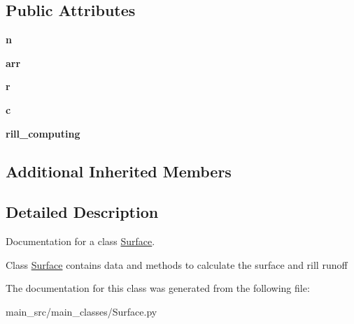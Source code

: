 \subsection*{Public Attributes}
\begin{DoxyCompactItemize}
\item 
\hypertarget{classmain__src_1_1main__classes_1_1Surface_1_1Surface_affe1eb422f70176b0402825e8baf11d4}{{\bfseries n}}\label{classmain__src_1_1main__classes_1_1Surface_1_1Surface_affe1eb422f70176b0402825e8baf11d4}

\item 
\hypertarget{classmain__src_1_1main__classes_1_1Surface_1_1Surface_ab672eba1391bdf0c79dbf2c6ee751b56}{{\bfseries arr}}\label{classmain__src_1_1main__classes_1_1Surface_1_1Surface_ab672eba1391bdf0c79dbf2c6ee751b56}

\item 
\hypertarget{classmain__src_1_1main__classes_1_1Surface_1_1Surface_a02a98426c0d4f7ff0fb32623250d7c84}{{\bfseries r}}\label{classmain__src_1_1main__classes_1_1Surface_1_1Surface_a02a98426c0d4f7ff0fb32623250d7c84}

\item 
\hypertarget{classmain__src_1_1main__classes_1_1Surface_1_1Surface_acecb58c85e7a2cc6a0492227df01f92a}{{\bfseries c}}\label{classmain__src_1_1main__classes_1_1Surface_1_1Surface_acecb58c85e7a2cc6a0492227df01f92a}

\item 
\hypertarget{classmain__src_1_1main__classes_1_1Surface_1_1Surface_a11a0f332c92e9067e2271812beddfeef}{{\bfseries rill\-\_\-computing}}\label{classmain__src_1_1main__classes_1_1Surface_1_1Surface_a11a0f332c92e9067e2271812beddfeef}

\end{DoxyCompactItemize}
\subsection*{Additional Inherited Members}


\subsection{Detailed Description}
Documentation for a class \hyperlink{classmain__src_1_1main__classes_1_1Surface_1_1Surface}{Surface}. 

Class \hyperlink{classmain__src_1_1main__classes_1_1Surface_1_1Surface}{Surface} contains data and methods to calculate the surface and rill runoff 

The documentation for this class was generated from the following file\-:\begin{DoxyCompactItemize}
\item 
main\-\_\-src/main\-\_\-classes/Surface.\-py\end{DoxyCompactItemize}
